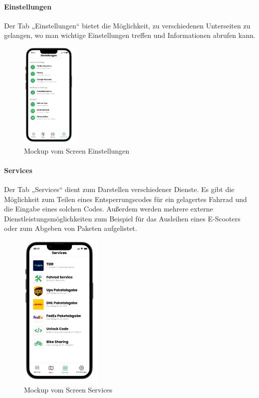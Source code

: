 \medskip

\paragraph{Einstellungen}Der \Gls{Tab} „Einstellungen“ bietet die Möglichkeit, zu verschiedenen Unterseiten zu gelangen, wo man wichtige Einstellungen treffen und Informationen abrufen kann.

\begin{figure}[H]
  \centering
  \includegraphics[width=0.25\textwidth]{images/app_mock_settings}
  \caption{\Gls{Mockup} vom Screen Einstellungen}
  \label{fig:screensettingsmock}
\end{figure}

\bigskip
\clearpage

\paragraph{Services}Der \Gls{Tab} „Services“ dient zum Darstellen verschiedener Dienste. Es gibt die Möglichkeit zum Teilen eines Entsperrungscodes für ein gelagertes Fahrrad und die Eingabe eines solchen Codes. Außerdem werden mehrere externe Dienstleistungsmöglichkeiten zum Beispiel für das Ausleihen eines E-Scooters oder zum Abgeben von Paketen aufgelistet.

\begin{figure}[H]
  \centering
  \includegraphics[width=0.35\textwidth]{images/app_mock_services}
  \caption{\Gls{Mockup} vom Screen Services}
  \label{fig:screenservicesmock}
\end{figure}

